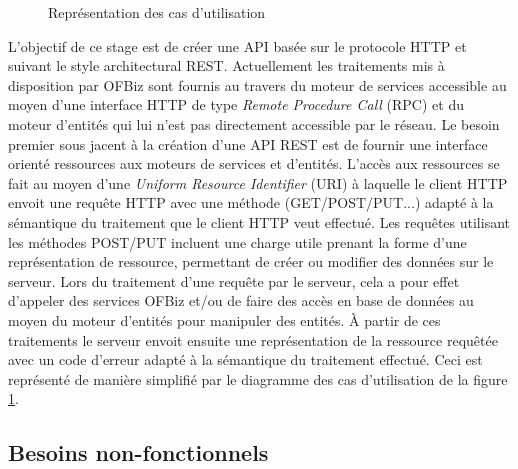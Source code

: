 \documentclass[a4paper, 11pt]{report}
\begin{document}
\begin{figure}
  \centering
  \caption{Représentation des cas d'utilisation}
  \label{fig:needs}
\end{figure}

L'objectif de ce stage est de créer une API basée sur le protocole
HTTP et suivant le style architectural REST.  Actuellement les
traitements mis à disposition par OFBiz sont fournis au travers du
moteur de services accessible au moyen d'une interface HTTP de type
\emph{Remote Procedure Call} (RPC) et du moteur d'entités qui lui
n'est pas directement accessible par le réseau.  Le besoin premier
sous jacent à la création d'une API REST est de fournir une interface
orienté ressources aux moteurs de services et d'entités.  L'accès aux
ressources se fait au moyen d'une \emph{Uniform Resource Identifier}
(URI) à laquelle le client HTTP envoit une requête HTTP avec une
méthode (GET/POST/PUT...) adapté à la sémantique du traitement que le
client HTTP veut effectué.  Les requêtes utilisant les méthodes
POST/PUT incluent une charge utile prenant la forme d'une
représentation de ressource, permettant de créer ou modifier des
données sur le serveur.  Lors du traitement d'une requête par le
serveur, cela a pour effet d'appeler des services OFBiz et/ou de faire
des accès en base de données au moyen du moteur d'entités pour
manipuler des entités.  À partir de ces traitements le serveur envoit
ensuite une représentation de la ressource requêtée avec un code
d'erreur adapté à la sémantique du traitement effectué.  Ceci est
représenté de manière simplifié par le diagramme des cas d'utilisation
de la figure \ref{fig:needs}.

\subsection{Besoins non-fonctionnels}
\end{document}
